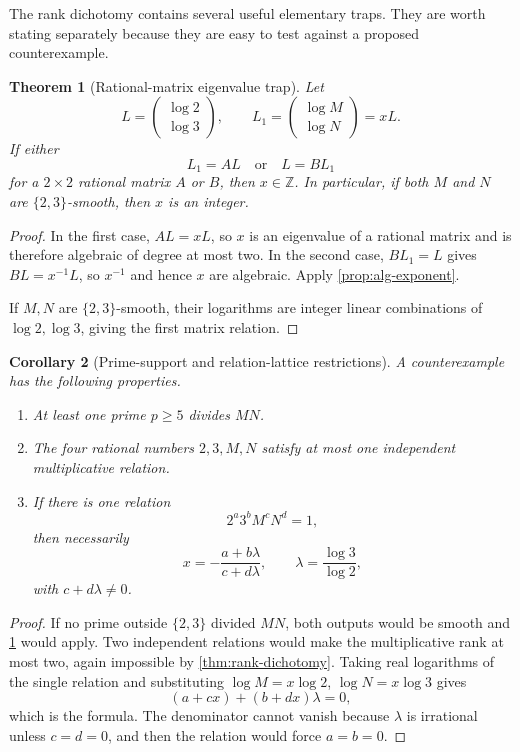 \documentclass[11pt]{article}
\newtheorem{theorem}{Theorem}[section]
\newtheorem{corollary}[theorem]{Corollary}
\theoremstyle{definition}
\newcommand{\Z}{\mathbb{Z}}
\begin{document}
The rank dichotomy contains several useful elementary traps.  They are worth
stating separately because they are easy to test against a proposed
counterexample.

\begin{theorem}[Rational-matrix eigenvalue trap]
\label{thm:eigenvalue-trap}
Let
\[
   L=\begin{pmatrix}\log2\\ \log3\end{pmatrix},
   \qquad
   L_1=\begin{pmatrix}\log M\\ \log N\end{pmatrix}=xL.
\]
If either
\[
       L_1=A L
       \quad\text{or}\quad
       L=B L_1
\]
for a $2\times2$ rational matrix $A$ or $B$, then $x\in\Z$.
In particular, if both $M$ and $N$ are $\{2,3\}$-smooth, then $x$ is an
integer.
\end{theorem}

\begin{proof}
In the first case, $AL=xL$, so $x$ is an eigenvalue of a rational matrix and
is therefore algebraic of degree at most two.  In the second case,
$BL_1=L$ gives $BL=x^{-1}L$, so $x^{-1}$ and hence $x$ are algebraic.  Apply
\cref{prop:alg-exponent}.

If $M,N$ are $\{2,3\}$-smooth, their logarithms are integer linear
combinations of $\log2,\log3$, giving the first matrix relation.
\end{proof}

\begin{corollary}[Prime-support and relation-lattice restrictions]
\label{cor:support-rank}
A counterexample has the following properties.
\begin{enumerate}[label=\textup{(\roman*)}]
\item At least one prime $p\geq5$ divides $MN$.
\item The four rational numbers $2,3,M,N$ satisfy at most one independent
multiplicative relation.
\item If there is one relation
\[
       2^a3^bM^cN^d=1,
\]
then necessarily
\[
       x=-\frac{a+b\lambda}{c+d\lambda},
       \qquad \lambda=\frac{\log3}{\log2},
\]
with $c+d\lambda\neq0$.
\end{enumerate}
\end{corollary}

\begin{proof}
If no prime outside $\{2,3\}$ divided $MN$, both outputs would be smooth and
\cref{thm:eigenvalue-trap} would apply.  Two independent relations would make
the multiplicative rank at most two, again impossible by
\cref{thm:rank-dichotomy}.  Taking real logarithms of the single relation and
substituting $\log M=x\log2$, $\log N=x\log3$ gives
\[
      (a+cx)+(b+dx)\lambda=0,
\]
which is the formula.  The denominator cannot vanish because $\lambda$ is
irrational unless $c=d=0$, and then the relation would force $a=b=0$.
\end{proof}
\end{document}
